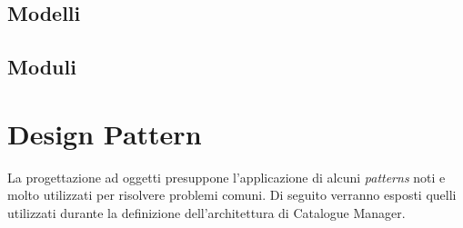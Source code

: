 \subsection{Modelli} \label{modelli}

  
\subsection{Moduli} \label{moduli}


\section{Design Pattern}
La progettazione ad oggetti presuppone l'applicazione di alcuni \textit{patterns} noti e molto utilizzati per risolvere problemi comuni. Di seguito verranno esposti quelli utilizzati durante la definizione dell'architettura di Catalogue Manager.
